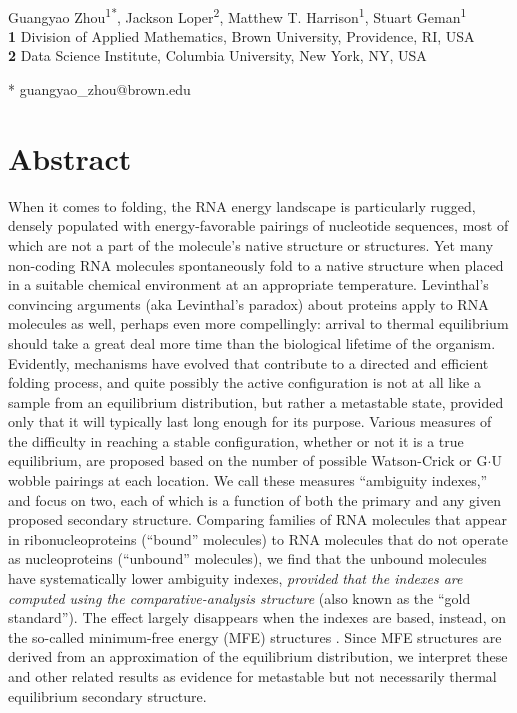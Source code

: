 \documentclass[10pt,letterpaper]{article}
\date{}
\begin{document}
\vspace*{0.2in}


\begin{flushleft}
{\Large
\textbf{} 
}
\newline
\\
Guangyao Zhou\textsuperscript{1*},
Jackson Loper\textsuperscript{2},
Matthew T. Harrison\textsuperscript{1},
Stuart Geman\textsuperscript{1}
\\
\bigskip
\textbf{1} Division of Applied Mathematics, Brown University, Providence, RI, USA
\\
\textbf{2} Data Science Institute, Columbia University, New York, NY, USA
\\
\bigskip

* guangyao\_zhou@brown.edu

\end{flushleft}

\section*{Abstract}
When it comes to folding, the RNA energy landscape is particularly rugged, densely populated with 
energy-favorable pairings of nucleotide sequences, most of which are not a part of the molecule's native structure or structures. Yet many non-coding RNA molecules spontaneously fold to a native structure when placed in a suitable chemical environment at an appropriate temperature.
Levinthal's convincing arguments\cite{Levinthal1969-hi} (aka Levinthal's paradox) about proteins apply to RNA molecules as well, perhaps even more compellingly: arrival to thermal equilibrium should take a great deal more time than the biological lifetime of the organism. Evidently, mechanisms have evolved that contribute to a directed and efficient folding process, and quite possibly the active configuration is not at all like a sample from an equilibrium distribution, but rather a metastable state, provided only that it will typically last long enough for its purpose. 
Various measures of the difficulty in reaching a stable configuration, whether or not it is a true equilibrium,
are proposed based on the number of possible Watson-Crick or G$\cdot$U wobble pairings at each location. We call these measures ``ambiguity indexes,'' and focus on two, each of which is a function of both the primary and any given proposed secondary structure. Comparing families of RNA molecules that appear in ribonucleoproteins (``bound'' molecules) to RNA molecules that do not operate as nucleoproteins (``unbound'' molecules), we find that the unbound molecules have systematically lower ambiguity indexes, {\em provided that the indexes are computed using the comparative-analysis \cite{Gutell1992-hu} structure} (also known as the ``gold standard''). The effect largely disappears when the indexes are based, instead, on the so-called minimum-free energy (MFE) structures \cite{Mathews1999-hc,Zuker1999-rc}. Since MFE structures are derived from an approximation of the equilibrium distribution, we interpret these and other related results as evidence for metastable but not necessarily thermal equilibrium secondary structure. 
\end{document}
